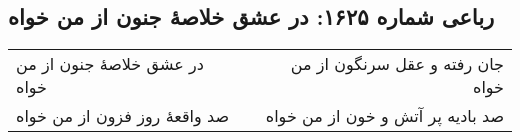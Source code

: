 \begin{center}
\section*{رباعی شماره ۱۶۲۵: در عشق خلاصهٔ جنون از من خواه}
\label{sec:1625}
\begin{longtable}{l p{0.5cm} r}
در عشق خلاصهٔ جنون از من خواه
&&
جان رفته و عقل سرنگون از من خواه
\\
صد واقعهٔ روز فزون از من خواه
&&
صد بادیه پر آتش و خون از من خواه
\\
\end{longtable}
\end{center}

